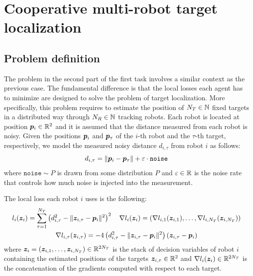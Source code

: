 \documentclass[a4paper,11pt,oneside]{book}
\begin{document}
\chapter{Cooperative multi-robot target localization} \label{ch:localization}


\section{Problem definition}

The problem in the second part of the first task involves a similar context as the previous case. The fundamental difference is that the local losses each agent has to minimize are designed to solve the problem of target localization. More specifically, this problem requires to estimate the position of $N_T \in {\mathbb{N}}$ fixed targets in a distributed way through $N_R \in {\mathbb{N}}$ tracking robots. Each robot is located at position ${\bm{p}}_i \in {\mathbb{R}}^2$ and it is assumed that the distance measured from each robot is noisy. Given the positions ${\bm{p}}_i$ and ${\bm{p}}_\tau$ of the $i$-th robot and the $\tau$-th target, respectively, we model the measured noisy distance $d_{i,\tau}$ from robot $i$ as follows:
\[
      d_{i,\tau} = \Vert {\bm{p}}_i - {\bm{p}}_\tau \Vert + \varepsilon \cdot \texttt{noise}
\]
where $\texttt{noise} \sim P$ is drawn from some distribution $P$ and $\varepsilon \in {\mathbb{R}}$ is the noise rate that controls how much noise is injected into the measurement.

The local loss each robot $i$ uses is the following:
\[
      \begin{gathered}
            l_i({\bm{z}}_i) = \sum_{\tau=1}^{N_T} \left( d_{i,\tau}^2 - \Vert {\bm{z}}_{i,\tau} - {\bm{p}}_i \Vert^2 \right)^2
            \quad
            \nabla l_{i}({\bm{z}}_i) = (\nabla l_{i,1}({\bm{z}}_{i,1}), \dots, \nabla l_{i,N_T}({\bm{z}}_{i,N_T}))
            \\
            \nabla l_{i,\tau}({\bm{z}}_{i,\tau}) = -4 \left( d_{i,\tau}^2 - \Vert {\bm{z}}_{i,\tau} - {\bm{p}}_i \Vert^2 \right) \left( {\bm{z}}_{i,\tau} - {\bm{p}}_i \right)
      \end{gathered}
\]
where ${\bm{z}}_i = ({\bm{z}}_{i,1}, \dots, {\bm{z}}_{i,N_T}) \in {\mathbb{R}}^{2N_T}$ is the stack of decision variables of robot $i$ containing the estimated positions of the targets ${\bm{z}}_{i,\tau} \in {\mathbb{R}}^2$ and $\nabla l_i({\bm{z}}_i) \in {\mathbb{R}}^{2N_T}$ is the concatenation of the gradients computed with respect to each target.
\end{document}

